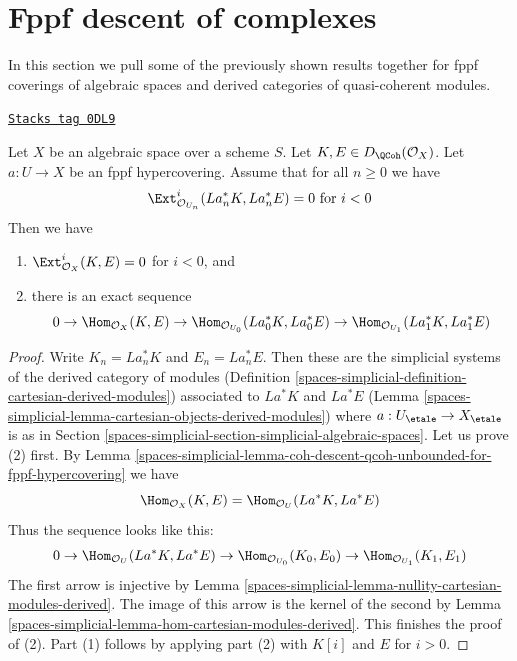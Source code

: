 \section{Fppf descent of complexes}
\label{spaces-simplicial-section-fppf-descent-derived}
In this section we pull some of the previously shown
results together for fppf coverings of algebraic spaces
and derived categories of quasi-coherent modules.

\begin{lemma}
\label{spaces-simplicial-lemma-fppf-neg-ext-zero-hom}
\href{https://stacks.math.columbia.edu/tag/0DL9}{\texttt{Stacks tag 0DL9}}

Let $X$ be an algebraic space over a scheme $S$.
Let $K, E \in D_\QCoh(\mathcal{O}_X)$.
Let $a : U \to X$ be an fppf hypercovering.
Assume that for all $n \geq 0$ we have
$$
\Ext_{\mathcal{O}_{U_n}}^i(La_n^*K, La_n^*E) = 0
\text{ for } i < 0
$$
Then we have
\begin{enumerate}
\item $\Ext_{\mathcal{O}_X}^i(K, E) = 0$ for $i < 0$, and
\item there is an exact sequence
$$
0
\to
\Hom_{\mathcal{O}_X}(K, E)
\to
\Hom_{\mathcal{O}_{U_0}}(La_0^*K, La_0^*E)
\to
\Hom_{\mathcal{O}_{U_1}}(La_1^*K, La_1^*E)
$$
\end{enumerate}
\end{lemma}

\begin{proof}
Write $K_n = La_n^*K$ and $E_n = La_n^*E$. Then these are the
simplicial systems of the derived category of modules
(Definition \ref{spaces-simplicial-definition-cartesian-derived-modules})
associated to $La^*K$ and $La^*E$
(Lemma \ref{spaces-simplicial-lemma-cartesian-objects-derived-modules})
where $a : U_\etale \to X_\etale$ is as in
Section \ref{spaces-simplicial-section-simplicial-algebraic-spaces}.
Let us prove (2) first. By
Lemma \ref{spaces-simplicial-lemma-coh-descent-qcoh-unbounded-for-fppf-hypercovering}
we have
$$
\Hom_{\mathcal{O}_X}(K, E) =
\Hom_{\mathcal{O}_U}(La^*K, La^*E)
$$
Thus the sequence looks like this:
$$
0
\to
\Hom_{\mathcal{O}_U}(La^*K, La^*E)
\to
\Hom_{\mathcal{O}_{U_0}}(K_0, E_0)
\to
\Hom_{\mathcal{O}_{U_1}}(K_1, E_1)
$$
The first arrow  is injective by
Lemma \ref{spaces-simplicial-lemma-nullity-cartesian-modules-derived}.
The image of this arrow is the kernel of the second
by Lemma \ref{spaces-simplicial-lemma-hom-cartesian-modules-derived}.
This finishes the proof of (2).
Part (1) follows by applying part (2) with
$K[i]$ and $E$ for $i > 0$.
\end{proof}

